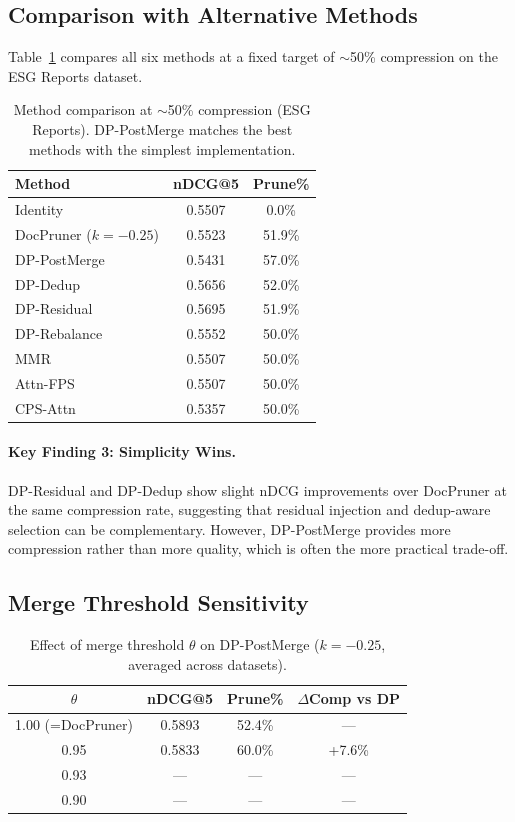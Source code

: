\documentclass[11pt]{article}
\begin{document}
\subsection{Comparison with Alternative Methods}

Table~\ref{tab:alternatives} compares all six methods at a fixed target of $\sim$50\% compression on the ESG Reports dataset.

\begin{table}[t]
\centering
\small
\caption{Method comparison at $\sim$50\% compression (ESG Reports). DP-PostMerge matches the best methods with the simplest implementation.}
\label{tab:alternatives}
\begin{tabular}{l c c}
\toprule
\textbf{Method} & \textbf{nDCG@5} & \textbf{Prune\%} \\
\midrule
Identity & 0.5507 & 0.0\% \\
\midrule
DocPruner ($k{=}{-}0.25$) & 0.5523 & 51.9\% \\
DP-PostMerge & 0.5431 & 57.0\% \\
DP-Dedup & 0.5656 & 52.0\% \\
DP-Residual & 0.5695 & 51.9\% \\
DP-Rebalance & 0.5552 & 50.0\% \\
MMR & 0.5507 & 50.0\% \\
Attn-FPS & 0.5507 & 50.0\% \\
CPS-Attn & 0.5357 & 50.0\% \\
\bottomrule
\end{tabular}
\end{table}

\paragraph{Key Finding 3: Simplicity Wins.}
DP-Residual and DP-Dedup show slight nDCG improvements over DocPruner at the same compression rate, suggesting that residual injection and dedup-aware selection can be complementary.
However, DP-PostMerge provides more compression rather than more quality, which is often the more practical trade-off.

\subsection{Merge Threshold Sensitivity}

\begin{table}[t]
\centering
\small
\caption{Effect of merge threshold $\theta$ on DP-PostMerge ($k=-0.25$, averaged across datasets).}
\label{tab:threshold}
\begin{tabular}{c c c c}
\toprule
$\theta$ & \textbf{nDCG@5} & \textbf{Prune\%} & $\Delta$Comp vs DP \\
\midrule
1.00 (=DocPruner) & 0.5893 & 52.4\% & --- \\
0.95 & 0.5833 & 60.0\% & +7.6\% \\
0.93 & --- & --- & --- \\
0.90 & --- & --- & --- \\
\bottomrule
\end{tabular}
\end{table}
\end{document}
